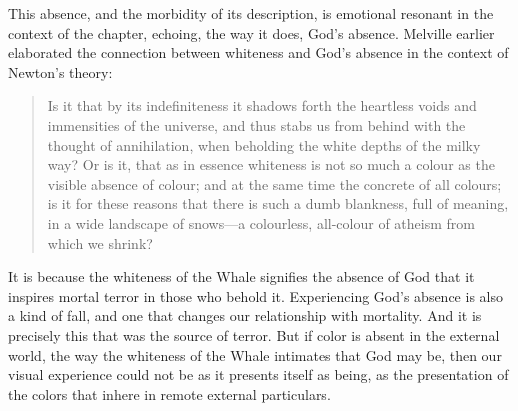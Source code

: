 This absence, and the morbidity of its description, is emotional resonant in the context of the chapter, echoing, the way it does, God's absence. Melville earlier elaborated the connection between whiteness and God's absence in the context of Newton's theory:
\begin{quote}
	Is it that by its indefiniteness it shadows forth the heartless voids and immensities of the universe, and thus stabs us from behind with the thought of annihilation, when beholding the white depths of the milky way? Or is it, that as in essence whiteness is not so much a colour as the visible absence of colour; and at the same time the concrete of all colours; is it for these reasons that there is such a dumb blankness, full of meaning, in a wide landscape of snows—a colourless, all-colour of atheism from which we shrink? \citep[ch. 42]{Melville:1851ms}
\end{quote} 
It is because the whiteness of the Whale signifies the absence of God that it inspires mortal terror in those who behold it. Experiencing God's absence is also a kind of fall, and one that changes our relationship with mortality. And it is precisely this that was the source of terror. But if color is absent in the external world, the way the whiteness of the Whale intimates that God may be, then our visual experience could not be as it presents itself as being, as the presentation of the colors that inhere in remote external particulars.


